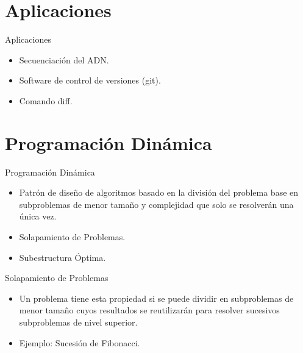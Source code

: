 \documentclass{beamer}
\begin{document}

	\section{Aplicaciones}

	
		\begin{frame}{Aplicaciones}
 			\begin{itemize}
			
  				\item Secuenciación del ADN.
  			
				\item Software de control de versiones (git).
  					
				\item Comando diff.

			\end{itemize}
		\end{frame}
			


	\section{Programación Dinámica}

	
		\begin{frame}{Programación Dinámica}
 			\begin{itemize}
			
  				\item Patrón de diseño de algoritmos basado en la división del problema base en subproblemas de menor tamaño y complejidad que solo se resolverán una única vez.
  			
				\item Solapamiento de Problemas.
  					
				\item Subestructura Óptima.

			\end{itemize}
		\end{frame}
	
		\begin{frame}{Solapamiento de Problemas}
 			\begin{itemize}
			
  				\item Un problema tiene esta propiedad si se puede dividir en subproblemas de menor tamaño cuyos resultados se reutilizarán para resolver sucesivos subproblemas de nivel superior.
  			
				\item Ejemplo: Sucesión de Fibonacci.
  					
			\end{itemize}
		\end{frame}
		
\end{document}
